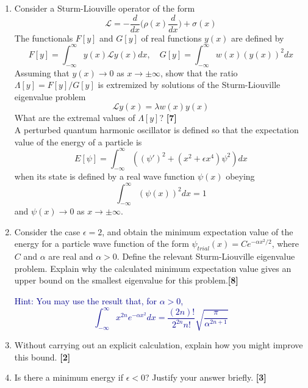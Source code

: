 \documentclass[a4paper]{article}
\begin{document}
\newpage
\begin{qns}\leavevmode
\begin{enumerate}[label=(\alph*)]
\item Consider a Sturm-Liouville operator of the form
$$\mathcal{L}=-\frac{d}{dx}\bigg(\rho(x)\frac{d}{dx}\bigg)+\sigma(x)$$
The functionals $F[y]$ and $G[y]$ of real functions $y(x)$ are defined by
$$F[y]=\int_{-\infty}^\infty y(x)\mathcal{L}y(x)dx,\quad G[y]=\int_{-\infty}^\infty w(x)(y(x))^2dx$$
Assuming that $y(x)\rightarrow 0$ as $x\rightarrow\pm\infty$, show that the ratio $\Lambda[y] = F[y]/G[y]$ is extremized by solutions of the Sturm-Liouville eigenvalue problem
$$\mathcal{L}y(x)=\lambda w(x)y(x)$$
What are the extremal values of $\Lambda[y]$? \hfill\textbf{[7]}\\[5pt]
A perturbed quantum harmonic oscillator is defined so that the expectation value of the energy of a particle is
$$E[\psi]=\int_{-\infty}^\infty((\psi')^2+(x^2+\epsilon x^4)\psi^2)dx$$
when its state is defined by a real wave function $\psi(x)$ obeying
$$\int_{-\infty}^\infty(\psi(x))^2dx=1$$
and $\psi(x)\rightarrow 0$ as $x\rightarrow\pm\infty$.
\item Consider the case $\epsilon=2$, and obtain the minimum expectation value of the energy for a particle wave function of the form  $\psi_{trial}(x) = C e^{-\alpha x^2/2}$, where $C$ and $\alpha$ are real and $\alpha>0$. Define the relevant Sturm-Liouville eigenvalue problem. Explain why the calculated minimum expectation value gives an upper bound on the smallest eigenvalue for this problem.\hfill\textbf{[8]}

\begin{mdframed}
\textcolor{darkblue}{Hint: You may use the result that, for $\alpha>0$,
$$\int_{-\infty}^\infty x^{2n}e^{-\alpha x^2}dx=\frac{(2n)!}{2^{2n}n!}\sqrt{\frac{\pi}{\alpha^{2n+1}}}$$}
\end{mdframed}
\item Without carrying out an explicit calculation, explain how you might improve this bound. \hfill\textbf{[2]}
\item Is there a minimum energy if $\epsilon<0$? Justify your answer briefly. \hfill\textbf{[3]}
\end{enumerate}
\end{qns}
\newpage
\end{document}
